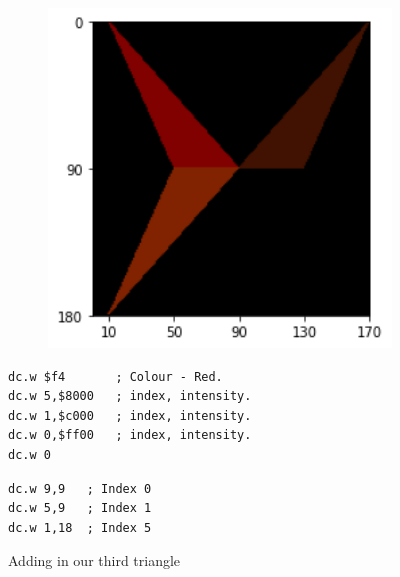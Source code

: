 \begin{figure}[H]
  \centering
  \begin{adjustbox}{width=13cm,center}
    \begin{minipage}[c]{0.48\linewidth}
      \begin{figure}[H]
        \centering
        \begin{adjustbox}{width=5.5cm,center}
          \includegraphics[width=12cm]{src/flipper/flipper_face_3.png}%
        \end{adjustbox}
      \end{figure}
    \end{minipage}
    \begin{minipage}[c]{0.48\linewidth}
      \begin{lstlisting}[basicstyle=\scriptsize\ttfamily]
dc.w $f4       ; Colour - Red.
dc.w 5,$8000   ; index, intensity.
dc.w 1,$c000   ; index, intensity.
dc.w 0,$ff00   ; index, intensity.
dc.w 0
      \end{lstlisting}
      \begin{lstlisting}[basicstyle=\scriptsize\ttfamily]
dc.w 9,9   ; Index 0
dc.w 5,9   ; Index 1
dc.w 1,18  ; Index 5
      \end{lstlisting}
      \vspace*{\fill}
    \end{minipage}
  \end{adjustbox}
  \caption{Adding in our third triangle}
\end{figure}

